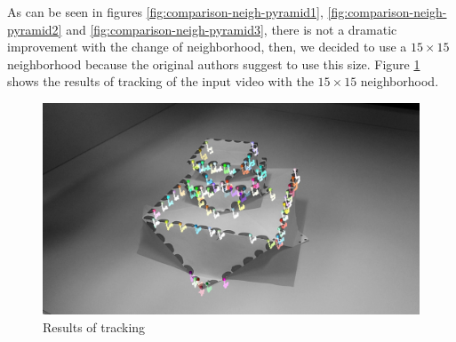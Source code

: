 As can be seen in figures \ref{fig:comparison-neigh-pyramid1}, \ref{fig:comparison-neigh-pyramid2} and \ref{fig:comparison-neigh-pyramid3}, there is not a dramatic improvement with the change of neighborhood, then, we decided to use a $15 \times 15$ neighborhood because the original authors suggest to use this size. Figure \ref{fig:final-tracking} shows the results of tracking of the input video with the $15 \times 15$ neighborhood.


\begin{figure}[!h]
    \includegraphics[width=0.99\linewidth]{figs/TrakingPyramid15x15.jpg}
    \caption{Results of tracking}
    \label{fig:final-tracking}
\end{figure}


